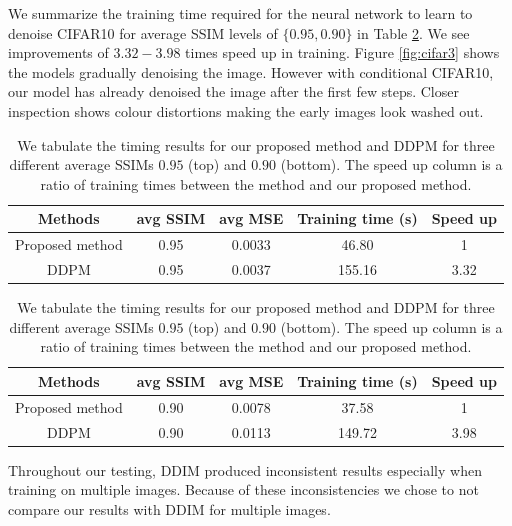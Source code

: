 \documentclass[]{interact}
\theoremstyle{plain}%
\theoremstyle{definition}
\theoremstyle{remark}
\begin{document}
We summarize the training time required for the neural network to learn to denoise CIFAR10 for average SSIM levels of $\{0.95, 0.90\}$ in Table \ref{tab:timing_table_cifar3}. We see improvements of $3.32 - 3.98$ times speed up in training. Figure \ref{fig:cifar3} shows the models gradually denoising the image. However with conditional CIFAR10, our model has already denoised the image after the first few steps. Closer inspection shows colour distortions making the early images look washed out. 
\begin{table}[]
    \centering
    \begin{tabular}{|c|c|c|c|c|}
\hline 
 Methods& avg SSIM&avg MSE&Training time (s) &Speed up\\ \hline\hline
     Proposed method &0.95&   0.0033&46.80 &1\\ \hline 
     DDPM &0.95& 
     0.0037&155.16 &3.32\\\hline\end{tabular}
    
    \begin{tabular}{|c|c|c|c|c|}
\hline 
 Methods& avg SSIM&avg MSE&Training time (s) &Speed up\\ \hline\hline 
     Proposed method &0.90&   0.0078&37.58 &1\\ \hline 
     DDPM &0.90& 
     0.0113&149.72 &3.98\\\hline\end{tabular}
\caption{We tabulate the timing results for our proposed method and DDPM for three different average SSIMs $0.95$ (top) and $0.90$ (bottom). The speed up column is a ratio of training times between the method and our proposed method.}\label{tab:timing_table_cifar3}
\end{table}
Throughout our testing, DDIM produced inconsistent results especially when training on multiple images. Because of these inconsistencies we chose to not compare our results with DDIM for multiple images.
\end{document}
